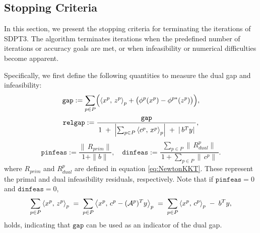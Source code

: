 \subsection{Stopping Criteria}
\label{sec:stopping_criteria}
In this section, we present the stopping criteria for terminating the iterations of SDPT3.
The algorithm terminates iterations when the predefined number of iterations or accuracy goals are met, or when infeasibility or numerical difficulties become apparent.

Specifically, we first define the following quantities to measure the dual gap and infeasibility:
\[
  \mathtt{gap}
  := \sum_{p\in P}
       \Bigl(\left\langle x^p, \, z^p \right\rangle_p + \bigl(\phi^p(x^p) - \phi^{p*}(z^p)\bigr)\Bigr),
\]
\[
  \mathtt{relgap}
  := \frac{\mathtt{gap}}
           {\,1 \;+\;\Bigl|\sum_{p\in P}\left\langle c^p, \, x^p \right\rangle_p\Bigr|
                 \;+\;|\,b^T y|\,},
\]
\[
  \mathtt{pinfeas}
  := \frac{\|\,R_{prim}\|}{\,1 + \|b\|\,},
  \quad
  \mathtt{dinfeas}
  := \frac{\sum_{p\in P}\|\,R^p_{dual}\|}
           {\,1 + \sum_{p\in P}\|\,c^p\|\,}.
\]
where $R_{prim}$ and $R_{dual}^p$ are defined in equation \eqref{eq:NewtonKKT}.
These represent the primal and dual infeasibility residuals, respectively.
Note that if $\mathtt{pinfeas} = 0$ and $\mathtt{dinfeas} = 0$,
\[
  \sum_{p\in P}\left\langle x^p, \, z^p \right\rangle_p 
  \;=\;
  \sum_{p\in P}\left\langle x^p, \, c^p - (\mathcal{A}^p)^T y \right\rangle_p
  \;=\; \sum_{p\in P}\left\langle x^p, \, c^p \right\rangle_p \;-\; b^T y,
\]
holds, indicating that $\mathtt{gap}$ can be used as an indicator of the dual gap.

